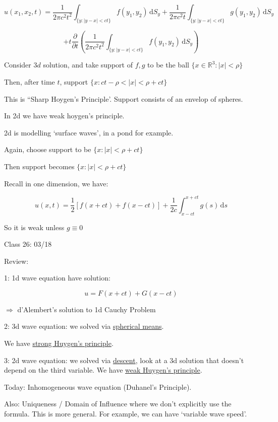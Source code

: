 \documentclass{article}
\theoremstyle{definition}
\begin{document}
\[
    u(x_1,x_2,t) = \frac{1}{2\pi c^2 t^2} \int_{\{ y: \vert y - x \vert < ct \} }^{} f(y_1, y_2) \,\mathrm{d}S_y + \frac{1}{2\pi c^2 t} \int_{\{ y:\vert y - x \vert < ct \} }^{} g(y_1, y_2) \,\mathrm{d}S_y 
\]

\[
    + t \frac{\partial}{\partial t} \left( \frac{1}{2\pi c^2 t^2} \int_{\{ y : \vert y - x \vert < ct \} }^{} f(y_1,y_2) \,\mathrm{d}S_y \right) 
\]

Consider \(3d\) solution, and take support of \(f,g\) to be the ball \(\{ x\in\mathbb{R}^3 : \vert x \vert < \rho \} \) 

Then, after time \(t\), support \(\{ x: ct - \rho < \vert x \vert < \rho + ct \} \) 

This is ``Sharp Hoygen's Principle'. Support consists of an envelop of spheres.

In 2d we have weak hoygen's principle.

2d is modelling `surface waves', in a pond for example.

Again, choose support to be \(\{x : \vert x \vert < \rho + ct\}\) 

Then support becomes \(\{x:\vert x\vert < \rho+ct\}\) 

Recall in one dimension, we have:

\[
    u(x,t) = \frac{1}{2} \left[ f(x+ct) + f(x-ct)\right] + \frac{1}{2c}\int_{x-ct}^{x+ct} g(s)\,\mathrm{d}s
\]

So it is weak unless \(g\equiv 0\) 

\hrulefill

Class 26: 03/18

Review:

1: 1d wave equation have solution:

\[
    u = F(x+ct)+G(x-ct)
\]

\(\Rightarrow\) d'Alembert's solution to 1d Cauchy Problem

2: 3d wave equation: we solved via \underline{spherical means}.

We have \underline{strong Huygen's principle}.

3: 2d wave equation: we solved via \underline{descent}, look at a 3d solution that doesn't depend on the third variable. We have \underline{weak Huygen's principle}.

Today: Inhomogeneous wave equation (Duhanel's Principle).

Also: Uniqueness / Domain of Influence where we don't explicitly use the formula. This is more general. For example, we can have `variable wave speed'.
\end{document}
